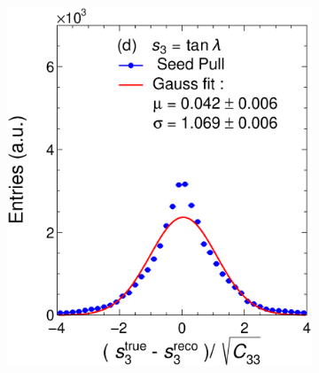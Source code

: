 \begin{figure}[t]
\begin{subfigure}{0.32\textwidth}
         \caption{}
         \label{fig:resp2SeedGAr_Int}
     \end{subfigure}
          \begin{subfigure}{0.32\textwidth}
         \centering
         \includegraphics[width=\textwidth]{figures/ch5-KF_NDGAr/FullSample/Int/Units/Unit3Seed.eps}
         \caption{}
         \label{fig:resp3SeedGAr_Int}
     \end{subfigure}
     \begin{subfigure}{0.32\textwidth}
         \centering

\end{subfigure}
\end{figure}
